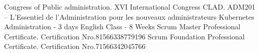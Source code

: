 
\begin{scholarship}
			{Congress of Public administration. XVI International Congress CLAD.}
			{ADM201 – L’Essentiel de l’Administration pour les nouveaux administrateurs}
			{Kubernetes Administration - 3 days}
			{English Class - 8 Weeks}
			{Scrum Master Professional Certificate. Certification Nro.81566338779196}
			{Scrum Foundation Professional Certificate. Certification Nro.71566342045766}

\end{scholarship}

